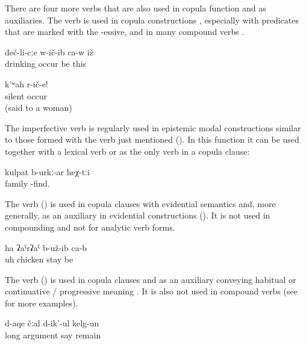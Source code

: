 There are four more verbs that are also used in copula function and as auxiliaries. The verb   is used in copula constructions , especially with predicates that are marked with the -essive, and in many compound verbs .
%
\begin{exe}
	\ex	\label{ex:He became a drinker}
	\gll	deč-li-cːe	w-ič-ib	ca-w	iž\\
		drinking	occur	be	this\\
	\glt	{}

	\ex	\label{ex:Be silent}
	\gll	k'ʷah	r-ič-e!\\
		silent	occur\\
	\glt	{} (said to a woman)
\end{exe}

The imperfective verb   is regularly used in epistemic modal constructions similar to those formed with the verb   just mentioned (). In this function it can be used together with a lexical verb or as the only verb in a copula clause: 

\begin{exe}
	\ex	\label{They are probably a family.COP}
	\gll	kulpat	b-urkː-ar			heχ-tːi\\
		family	-find.	\\
	\glt	{}
\end{exe}

The verb  ()  is used in copula clauses with evidential semantics  and, more generally, as an auxiliary in evidential constructions (). It is not used in compounding and not for analytic verb forms.
%
\begin{exe}
	\ex	\label{ex:Ah, it turned out to be a chicken}
	\gll	ha	ʡaˁrʡaˁ	b-už-ib	ca-b\\
		uh	chicken	stay	be\\
	\glt	{}
\end{exe}

The verb  ()  is used in copula clauses and as an auxiliary conveying habitual or continuative / progressive meaning . It is also not used in compound verbs (see  for more examples).
%
\begin{exe}
	\ex	\label{ex:‎‎They were arguing for a long time}
	\gll	d-aqe	čːal	d-ik'-ul	kelg-un\\
		long	argument	say	remain\\
	\glt	{}
\end{exe}


